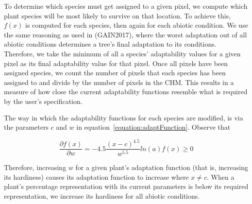 \documentclass[12pt]{report}
\begin{document}
To determine which species must get assigned to a given pixel, we compute which plant species will be most likely to survive on that location. To achieve this, $f(x)$ is computed for each species, then again for each abiotic condition. We use the same reasoning as used in (GAIN2017), where the worst adaptation out of all abiotic conditions determines a tree's final adaptation to its conditions. Therefore, we take the minimum of all a species' adaptability values for a given pixel as its final adaptability value for that pixel. Once all pixels have been assigned species, we count the number of pixels that each species has been assigned to and divide by the number of pixels in the CHM. This results in a measure of how close the current adaptability functions resemble what is required by the user's specification. 

The way in which the adaptability functions for each species are modified, is via the parameters $c$ and $w$ in equation~\ref{equation:adaptFunction}. Observe that 

\[
\frac{\partial f(x)}{\partial w} = -4.5 \frac{(x - c)^{4.5}}{w^{5.5}} ln(a) f(x) \geq 0
\]

Therefore, increasing $w$ for a given plant's adaptation function (that is, increasing its hardiness) causes its adaptation function to increase where $x \neq c$. When a plant's percentage representation with its current parameters is below its required representation, we increase its hardiness for all abiotic conditions. 
\end{document}
